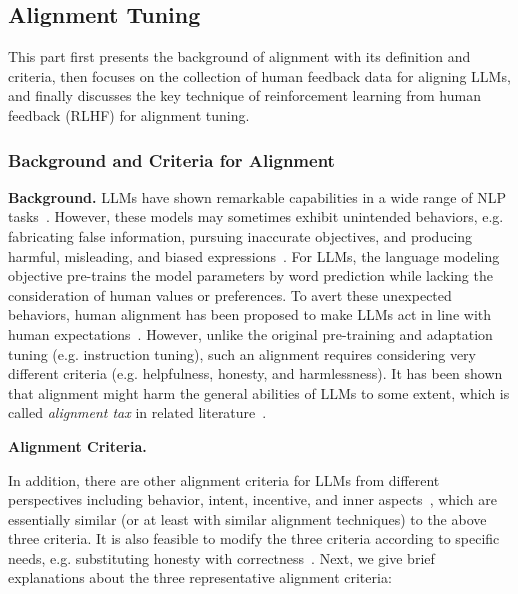 \subsection{Alignment Tuning}
\label{sec-alignment}

This part first presents the background of alignment with its definition and criteria, then focuses on the collection of human feedback data for aligning LLMs, and finally discusses the key technique of reinforcement learning from human feedback (RLHF) for alignment tuning. 

\subsubsection{Background and Criteria for Alignment}
\label{sec-alignment-background}
\textbf{Background.} LLMs have shown remarkable capabilities in a wide range of NLP tasks~\cite{Brown-NeurIPS-2020-Language,Chowdhery-arxiv-2022-PaLM,Wei-ICLR-2022-Finetuned,Zhang-arxiv-2022-OPT}. However, these models may sometimes exhibit  unintended behaviors, e.g. fabricating false information, pursuing inaccurate objectives, and producing harmful, misleading, and biased expressions~\cite{Ouyang-arxiv-2022-Training,Kenton-arxiv-2021-Alignment}. For LLMs, the language modeling objective pre-trains the model parameters by word prediction while lacking the consideration of human values or preferences. {To avert these unexpected behaviors, human alignment has been proposed to make LLMs act in line with human expectations}~\cite{Ouyang-arxiv-2022-Training,Ziegler-arxiv-2019-Fine-Tuning}. However, unlike the original pre-training  and adaptation tuning (e.g. instruction tuning), such an alignment requires considering very different criteria  (e.g. helpfulness, honesty, and harmlessness).  It has been shown that alignment might harm the general abilities of LLMs to some extent, which is called \emph{alignment tax} in related literature~\cite{Askell-arxiv-2021-A}.  

\textbf{Alignment Criteria.} 

In addition, there are  other alignment criteria for LLMs from different  perspectives including behavior, intent, incentive, and inner aspects~\cite{Kenton-arxiv-2021-Alignment}, which are essentially similar (or at least with similar  alignment techniques) to the above three criteria. It is also feasible to modify the three criteria according to specific needs, e.g. substituting honesty with correctness~\cite{Glaese-arxiv-2022-Improving}. Next, we give brief explanations about the three representative alignment criteria:

